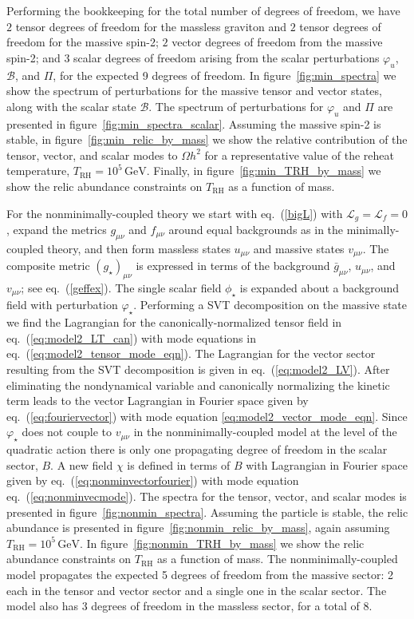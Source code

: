 \documentclass[11pt,a4paper]{article}
\newcommand{\Lcal}{\mathcal{L}}
\newcommand{\fref}[1]{figure~\ref{#1}}
\newcommand{\eref}[1]{eq.~(\ref{#1})}
\begin{document}
Performing the bookkeeping for the total number of degrees of freedom, we have $2$ tensor degrees of freedom for the massless graviton and $2$ tensor degrees of freedom for the massive spin-2; $2$ vector degrees of freedom from the massive spin-2; and $3$ scalar degrees of freedom arising from the scalar perturbations $\varphi_u$, $\mathcal{B}$, and $\Pi$, for the expected 9 degrees of freedom.  In \fref{fig:min_spectra} we show the spectrum of perturbations for the massive tensor and vector states, along with the scalar state $\mathcal{B}$.  The spectrum of perturbations for $\varphi_u$ and $\Pi$ are presented in \fref{fig:min_spectra_scalar}.  Assuming the massive spin-2 is stable, in \fref{fig:min_relic_by_mass} we show the relative contribution of the tensor, vector, and scalar modes to $\Omega h^2$ for a representative value of the reheat temperature, $T_\mathrm{RH}=10^5\, \mathrm{GeV}$.  Finally, in \fref{fig:min_TRH_by_mass} we show the relic abundance constraints on $T_\mathrm{RH}$ as a function of mass.

For the nonminimally-coupled theory we start with \eref{bigL} with $\Lcal_g = \Lcal_f = 0$, expand the metrics $g_{\mu\nu}$ and $f_{\mu\nu}$ around equal backgrounds as in the minimally-coupled theory, and then form massless states $u_{\mu\nu}$ and massive states $v_{\mu\nu}$.  The composite metric $(g_\star)_{\mu\nu}$ is expressed in terms of the background $\bar{g}_{\mu\nu}$, $u_{\mu\nu}$, and $v_{\mu\nu}$; see \eref{geffex}. The single scalar field $\phi_\star$ is expanded about a background field with perturbation $\varphi_\star$.  Performing a SVT decomposition on the massive state we find the Lagrangian for the canonically-normalized tensor field in \eref{eq:model2_LT_can} with mode equations in \eref{eq:model2_tensor_mode_eqn}.  The Lagrangian for the vector sector resulting from the SVT decomposition is given in \eref{eq:model2_LV}.  After eliminating the nondynamical variable and canonically normalizing the kinetic term leads to the vector  Lagrangian in Fourier space given by \eref{eq:fouriervector} with mode equation \eqref{eq:model2_vector_mode_eqn}.  Since $\varphi_\star$ does not couple to $v_{\mu\nu}$ in the nonminimally-coupled model at the level of the quadratic action there is only one propagating degree of freedom in the scalar sector, $B$.   A new field $\chi$ is defined in terms of $B$ with Lagrangian in Fourier space given by \eref{eq:nonminvectorfourier} with mode equation \eref{eq:nonminvecmode}.  The spectra for the tensor, vector, and scalar modes is presented in \fref{fig:nonmin_spectra}.  Assuming the particle is stable, the relic abundance is presented in \fref{fig:nonmin_relic_by_mass}, again assuming $T_\mathrm{RH}=10^5\, \mathrm{GeV}$.   In \fref{fig:nonmin_TRH_by_mass} we show the relic abundance constraints on $T_\mathrm{RH}$ as a function of mass.  The nonminimally-coupled model propagates the expected 5 degrees of freedom from the massive sector: 2 each in the tensor and vector sector and a single one in the scalar sector.  The model also has 3 degrees of freedom in the massless sector, for a total of 8.
\end{document}
